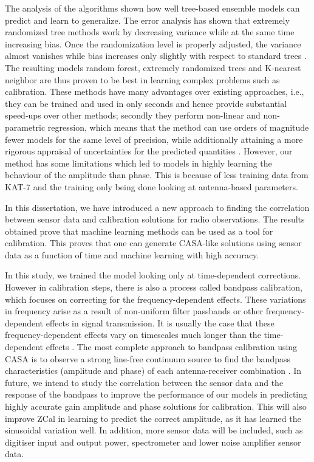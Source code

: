 The analysis of the algorithms shown how well tree-based ensemble models can predict and learn to generalize. The error
analysis has shown that extremely randomized tree methods work by decreasing variance while at the same time increasing bias. Once the randomization level is properly adjusted, the variance almost vanishes while bias increases only slightly with respect to standard trees \citep{geurts2006extremely}. The resulting models random forest, extremely randomized trees and K-nearest neighbor are thus proven to be best in learning complex problems such as calibration. These methods have many advantages over
existing approaches, i.e., they can be trained
and used in only seconds and hence provide substantial
speed-ups over other methods; secondly they perform non-linear and non-parametric regression, which means that the method can
use orders of magnitude fewer models for the same level
of precision, while additionally attaining a more rigorous
appraisal of uncertainties for the predicted quantities \citep{bellinger2016fundamental}. However, our method has some limitations which led to models in highly learning the behaviour of the amplitude than phase. This is because of less training data from KAT-7 and the training only being done looking at antenna-based parameters. 

In this dissertation, we have introduced a new approach to finding the correlation between sensor data and calibration solutions for radio observations. The results obtained prove that machine learning  methods can be used as a tool for calibration. This proves that one can generate CASA-like solutions using sensor data as a function of time and machine learning with high accuracy.

In this study, we trained the model looking only at time-dependent corrections. However in calibration steps, there is also a process called bandpass calibration, which focuses on correcting for the frequency-dependent effects. These variations in frequency arise as a result of non-uniform filter passbands or other frequency-dependent effects in signal transmission. It is usually the case that these frequency-dependent effects vary on timescales much longer than the time-dependent effects \citep{editioncasa}. The most complete approach to bandpass calibration using CASA is to observe a strong line-free continuum source to find the bandpass characteristics (amplitude and phase) of each antenna-receiver combination \citep{editioncasa}. In future, we intend to study the correlation between the sensor data and the response of the bandpass to improve the performance of our models in predicting highly accurate gain amplitude and phase solutions for calibration. This will also improve ZCal in learning to predict the correct amplitude, as it has learned the sinusoidal variation well. In addition, more sensor data will be included, such as digitiser input and output power, spectrometer and lower noise amplifier sensor data.  









